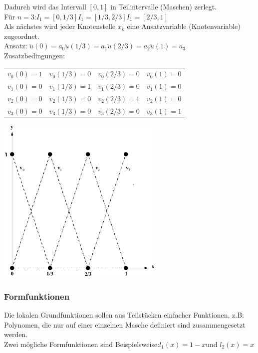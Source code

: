 \begin{minipage}{11cm}
Dadurch wird das Intervall $[0,1]$ in Teilintervalle (Maschen) zerlegt.\\
 
Für $n=3$:\quad $I_1=[0,1/3]$\quad $I_1=[1/3,2/3]$\quad $I_1=[2/3,1]$\\

Als nächstes wird jeder Knotenstelle $x_k$ eine Ansatzvariable (Knotenvariable) zugeordnet.\\

Ansatz: \quad $\tilde{u}(0)=a_0$\quad $\tilde{u}(1/3)=a_1$\quad $\tilde{u}(2/3)=a_2$\quad $\tilde{u}(1)=a_3$\\

Zusatzbedingungen:
\begin{tabular}{llll}
$v_0(0)=1$&$v_0(1/3)=0$&$v_0(2/3)=0$&$v_0(1)=0$\\
$v_1(0)=0$&$v_1(1/3)=1$&$v_1(2/3)=0$&$v_1(1)=0$\\
$v_2(0)=0$&$v_2(1/3)=0$&$v_2(2/3)=1$&$v_2(1)=0$\\
$v_3(0)=0$&$v_3(1/3)=0$&$v_3(2/3)=0$&$v_3(1)=1$\\
\end{tabular}
\end{minipage}
\hfill
\begin{minipage}{8cm}
\includegraphics[width=8cm]{Content/Numerik/Traeger1.png}
\end{minipage}


\subsubsection{Formfunktionen}
Die lokalen Grundfunktionen sollen aus Teilstücken einfacher Funktionen, z.B: Polynomen, die nur auf einer einzelnen Masche definiert sind zusammengesetzt werden.\\
Zwei mögliche Formfunktionen sind Beispielsweise:\quad $l_1(x)=1-x$\quad und \quad $l_2(x)=x$\\

